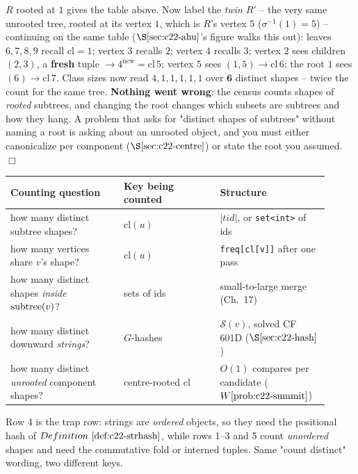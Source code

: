 \begin{tracebox}
\(R\) rooted at \(1\) gives the table above.  Now label the \emph{twin} \(R'\) --
the very same unrooted tree, rooted at its vertex \(1\), which is \(R\)'s vertex
\(5\) (\(\sigma^{-1}(1)=5\)) -- continuing on the same table
(\(\secref{c22-ahu}\)'s figure walks this out): leaves \(6,7,8,9\) recall
\(\mathrm{cl}=1\); vertex \(3\) recalls \(2\); vertex \(4\) recalls \(3\); vertex
\(2\) sees children \((2,3)\), a \textbf{fresh} tuple \(\to4^{\text{new}}=\mathrm{cl}\,5\);
vertex \(5\) sees \((1,5)\to\mathrm{cl}\,6\); the root \(1\) sees \((6)\to\mathrm{cl}\,7\).
Class sizes now read \(4,1,1,1,1,1\) over \(\mathbf{6}\) distinct shapes -- twice
the count for the same tree.  \textbf{Nothing went wrong}: the census counts
shapes of \emph{rooted} subtrees, and changing the root changes which subsets are
subtrees and how they hang.  A problem that asks for "distinct shapes of
subtrees" without naming a root is asking about an unrooted object, and you must
either canonicalize per component (\(\secref{c22-centre}\)) or state the root
you assumed. \(\Box\)
\end{tracebox}

\begin{insightbox}
\begin{center}\renewcommand{\arraystretch}{1.25}\setlength{\tabcolsep}{3pt}
\begin{tabular}{@{}p{0.33\linewidth} p{0.28\linewidth} p{0.30\linewidth}@{}}
\toprule
\textbf{Counting question} & \textbf{Key being counted} & \textbf{Structure}\\
\midrule
how many distinct subtree shapes? & \(\mathrm{cl}(u)\) & \(|\mathit{tid}|\), or \texttt{set<int>} of ids \\
how many vertices share \(v\)'s shape? & \(\mathrm{cl}(u)\) & \texttt{freq[cl[v]]} after one pass \\
how many distinct shapes \emph{inside} \(\operatorname{subtree}(v)\)? & sets of ids & small-to-large merge (Ch.~17) \\
how many distinct downward \emph{strings}? & \(G\)-hashes & \(\mathcal{S}(v)\), solved CF 601D (\(\secref{c22-hash}\)) \\
how many distinct \emph{unrooted} component shapes? & centre-rooted \(\mathrm{cl}\) & \(O(1)\) compares per candidate (\(\probref{c22-summit}\)) \\
\bottomrule
\end{tabular}\end{center}
Row 4 is the trap row: strings are \emph{ordered} objects, so they need the
positional hash of \(\defref{c22-strhash}\), while rows 1--3 and 5 count
\emph{unordered} shapes and need the commutative fold or interned tuples.  Same
"count distinct" wording, two different keys.
\end{insightbox}

